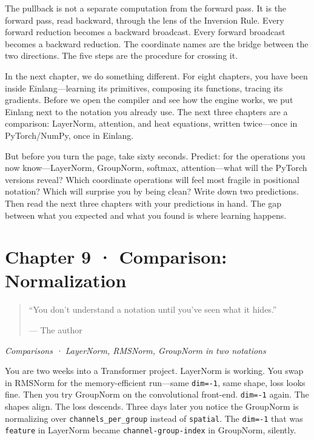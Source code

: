 \documentclass[11pt,titlepage]{article}
\begin{document}
The pullback is not a separate computation from the forward pass. It is
the forward pass, read backward, through the lens of the Inversion Rule.
Every forward reduction becomes a backward broadcast. Every forward
broadcast becomes a backward reduction. The coordinate names are the
bridge between the two directions. The five steps are the procedure for
crossing it.

In the next chapter, we do something different. For eight chapters, you
have been inside Einlang---learning its primitives, composing its
functions, tracing its gradients. Before we open the compiler and see
how the engine works, we put Einlang next to the notation you already
use. The next three chapters are a comparison: LayerNorm, attention, and
heat equations, written twice---once in PyTorch/NumPy, once in Einlang.

But before you turn the page, take sixty seconds. Predict: for the
operations you now know---LayerNorm, GroupNorm, softmax,
attention---what will the PyTorch versions reveal? Which coordinate
operations will feel most fragile in positional notation? Which will
surprise you by being clean? Write down two predictions. Then read the
next three chapters with your predictions in hand. The gap between what
you expected and what you found is where learning happens.

\newpage

\hypertarget{chapter-9-comparison-normalization}{%
\section{Chapter 9 · Comparison:
Normalization}\label{chapter-9-comparison-normalization}}

\begin{quote}
``You don't understand a notation until you've seen what it hides.''

--- The author
\end{quote}

\emph{Comparisons · LayerNorm, RMSNorm, GroupNorm in two notations}

\vspace{2em}

You are two weeks into a Transformer project. LayerNorm is working. You
swap in RMSNorm for the memory-efficient run---same \texttt{dim=-1},
same shape, loss looks fine. Then you try GroupNorm on the convolutional
front-end. \texttt{dim=-1} again. The shapes align. The loss descends.
Three days later you notice the GroupNorm is normalizing over
\texttt{channels\_per\_group} instead of \texttt{spatial}. The
\texttt{dim=-1} that was \texttt{feature} in LayerNorm became
\texttt{channel-group-index} in GroupNorm, silently.
\end{document}
